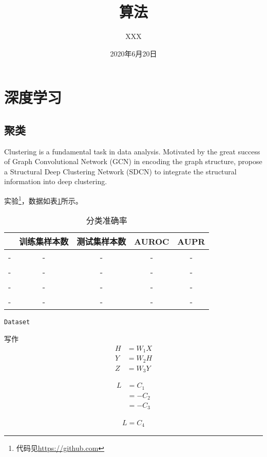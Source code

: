 \documentclass[hyperref,UTF8,11px,a4paper]{article} %
\title{算法}
\author{XXX}
\date{2020年6月20日}
\begin{document}
\maketitle
\thispagestyle{fancy} %

\section{深度学习}

\subsection{聚类}

Clustering is a fundamental task in data analysis. Motivated by the great success of Graph Convolutional Network (GCN) in encoding the graph structure, \citet{sdcn2020} propose a {\color{red} Structural Deep Clustering Network} (SDCN) to integrate the structural information into deep clustering. 

实验\footnote{代码见\url{https://github.com}}，数据如表\ref{tab:gc}所示。

\begin{table}[]
    \centering
    \caption{分类准确率}
    \label{tab:gc}
    \begin{tabular}{@{}ccccc@{}}
    \toprule
          & 训练集样本数 & 测试集样本数 & AUROC & AUPR \\ \midrule
    -  & - & - & - & - \\
    -  & - & - & - & - \\
    -  & - & - & - & - \\
    -  & - & - & - & - \\ \bottomrule
    \end{tabular}
\end{table}

\texttt{Dataset}

写作
\begin{equation}
	\begin{split}
		H&=W_1X\\
		Y&=W_2H\\
		Z&=W_3Y
	\end{split}
\end{equation}

\begin{align}
    L&=C_1\\
	&=-C_2\\
	&=-C_3
\end{align}

\begin{align}
    L=C_4
\end{align}



\end{document}
